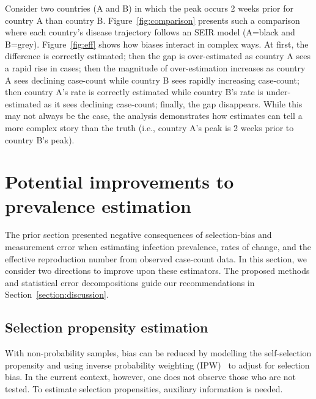 \documentclass[11pt]{amsart}
\numberwithin{equation}{section}
\theoremstyle{plain}
\begin{document}
 Consider two countries (A and B) in which the peak occurs 2 weeks prior for country A than country B.  Figure~\ref{fig:comparison} presents such a comparison where each country's disease trajectory follows an SEIR model (A=black and B=grey). Figure~\ref{fig:eff} shows how biases interact in complex ways.  At first, the difference is correctly estimated; then the gap is over-estimated as country A sees a rapid rise in cases; then the magnitude of over-estimation increases as country A sees declining case-count while country B sees rapidly increasing case-count; then country A's rate is correctly estimated while country B's rate is under-estimated as it sees declining case-count; finally, the gap disappears.  While this may not always be the case, the analysis demonstrates how estimates can tell a more complex story than the truth (i.e., country A's peak is 2 weeks prior to country B's peak).

 \section{Potential improvements to prevalence estimation}
 \label{section:improvedcasecount}

 The prior section presented negative consequences of selection-bias and measurement error when estimating infection prevalence, rates of change, and the effective reproduction number from observed case-count data.  In this section, we consider two directions to improve upon these estimators.
 The proposed methods and statistical error decompositions guide our recommendations in Section~\ref{section:discussion}.

 \subsection{Selection propensity estimation}

 With non-probability samples, bias can be reduced by modelling the self-selection propensity and using inverse probability weighting (IPW)~\citep{Elliott2017} to adjust for selection bias.
 In the current context, however, one does not observe those who are not tested.  To estimate selection propensities, auxiliary information is needed.
\end{document}
